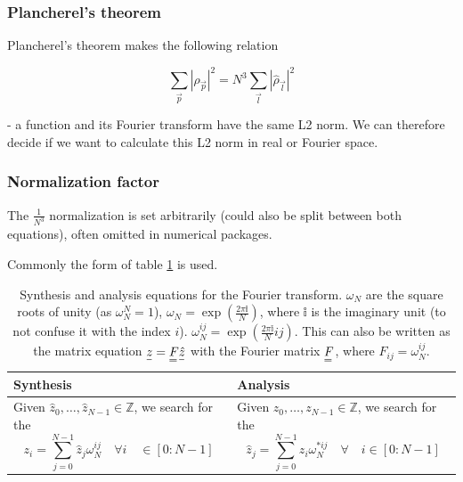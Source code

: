 \subsubsection{Plancherel's theorem}
Plancherel's theorem makes the following relation

\begin{equation}
    \sum_{\vec{p}}\left|\rho_{\vec{p}}\right|^2=N^3 \sum_{\vec{l}}\left|\hat{\rho}_{\vec{l}}\right|^2
\end{equation}

- a function and its Fourier transform have the same L2 norm. We can therefore
decide if we want to calculate this L2 norm in real or Fourier space.

\subsubsection{Normalization factor}
The $\frac{1}{N^3}$ normalization is set arbitrarily (could also
be split between both equations), often omitted in numerical packages.

Commonly the form of table \ref{tab:fourier_synthesis_analysis} is used.

\begin{table}
    \begin{tabular}{|p{}|p{}|}
        \hline
        \textbf{Synthesis} & \textbf{Analysis} \\
        \hline
        Given $\hat{z}_0, \dots, \hat{z}_{N-1} \in \mathbb{Z}$, we search for the
        \begin{equation}
            z_i=\sum_{j=0}^{N-1} \hat{z}_j \omega_N^{i j} \quad \forall i \quad \in[0: N-1]
        \end{equation} &
        Given $z_0, \dots, z_{N-1} \in \mathbb{Z}$, we search for the
        \begin{equation}
            \hat{z}_j=\sum_{j=0}^{N-1} z_i \omega_N^{* i j} \quad \forall \quad i \in[0: N-1]
        \end{equation} \\
        \hline
    \end{tabular}
    \caption{Synthesis and analysis equations for the Fourier transform. $\omega_N$ are the square roots of unity (as $\omega_N^N = 1$), $\omega_N = \exp{\left( \frac{2\pi \mathbb{i}}{N} \right)}$,
    where $\mathbb{i}$ is the imaginary unit (to not confuse it with the index $i$). $\omega_N^{i j} = \exp{\left( \frac{2\pi \mathbb{i}}{N} ij \right)}$. This can
    also be written as the matrix equation $\vec{z} = \mat{F} \vec{\hat{z}}$ with the Fourier matrix $\mat{F}$, where $F_{i j} = \omega_N^{i j}$.}
    \label{tab:fourier_synthesis_analysis}
\end{table}

